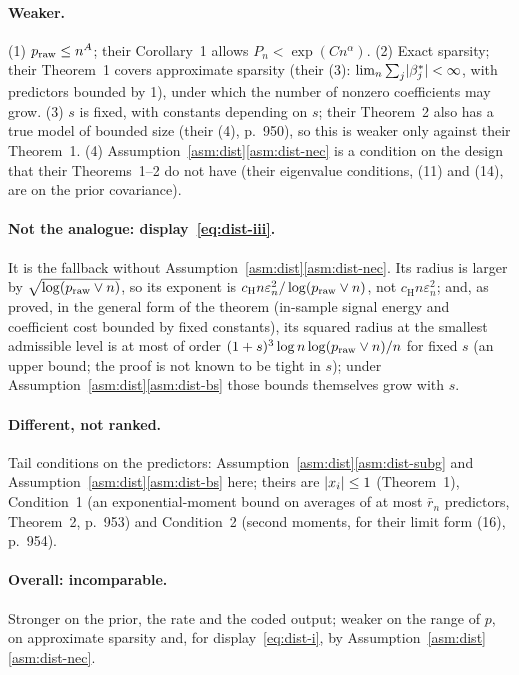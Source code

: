 \paragraph{Weaker.} (1) $p_{\mathrm{raw}}\le n^A$; their Corollary~1 allows $P_n<\exp(Cn^\alpha)$. (2) Exact sparsity; their
Theorem~1 covers approximate sparsity (their (3): $\lim_n\sum_j\lvert \beta^*_j\rvert<\infty$, with predictors bounded by 1), under
which the number of nonzero coefficients may grow. (3) $s$ is fixed, with constants depending on $s$; their Theorem~2 also
has a true model of bounded size (their (4), p.~950), so this is weaker only against their Theorem~1. (4)
Assumption~\ref{asm:dist}\ref{asm:dist-nec} is a condition on the design that their Theorems~1--2 do not have (their eigenvalue
conditions, (11) and (14), are on the prior covariance).

\paragraph{Not the analogue: display~\eqref{eq:dist-iii}.} It is the fallback without Assumption~\ref{asm:dist}\ref{asm:dist-nec}. Its radius is larger
by $\sqrt{\log(p_{\mathrm{raw}}\vee n)}$, so its exponent is $c_{\mathrm H} n\varepsilon_n^2/\log(p_{\mathrm{raw}}\vee n)$, not $c_{\mathrm H} n\varepsilon_n^2$; and, as
proved, in the general form of the theorem (in-sample signal energy and coefficient cost bounded by fixed constants), its
squared radius at the smallest admissible level is at most of order $(1+s)^3\log n\log(p_{\mathrm{raw}}\vee n)/n$ for fixed $s$ (an
upper bound; the proof is not known to be tight in $s$); under Assumption~\ref{asm:dist}\ref{asm:dist-bs} those bounds themselves grow with $s$.

\paragraph{Different, not ranked.} Tail conditions on the predictors: Assumption~\ref{asm:dist}\ref{asm:dist-subg} and Assumption~\ref{asm:dist}\ref{asm:dist-bs} here;
theirs are $\lvert x_i\rvert\le1$ (Theorem~1), Condition~1 (an exponential-moment bound on averages of at most $\bar r_n$
predictors, Theorem~2, p.~953) and Condition~2 (second moments, for their limit form (16), p.~954).

\paragraph{Overall: incomparable.} Stronger on the prior, the rate and the coded output; weaker on the range of $p$, on
approximate sparsity and, for display~\eqref{eq:dist-i}, by Assumption~\ref{asm:dist}\ref{asm:dist-nec}.
